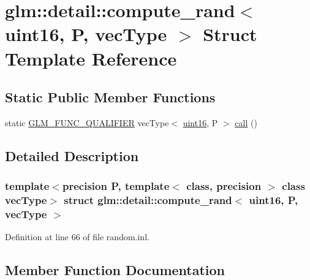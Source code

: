 \hypertarget{structglm_1_1detail_1_1compute__rand_3_01uint16_00_01_p_00_01vec_type_01_4}{}\section{glm\+::detail\+::compute\+\_\+rand$<$ uint16, P, vec\+Type $>$ Struct Template Reference}
\label{structglm_1_1detail_1_1compute__rand_3_01uint16_00_01_p_00_01vec_type_01_4}
\subsection*{Static Public Member Functions}
\begin{DoxyCompactItemize}
\item 
static \mbox{\hyperlink{setup_8hpp_a33fdea6f91c5f834105f7415e2a64407}{G\+L\+M\+\_\+\+F\+U\+N\+C\+\_\+\+Q\+U\+A\+L\+I\+F\+I\+ER}} vec\+Type$<$ \mbox{\hyperlink{namespaceglm_1_1detail_a47b2a7d006d187338e8031a352d1ce56}{uint16}}, P $>$ \mbox{\hyperlink{structglm_1_1detail_1_1compute__rand_3_01uint16_00_01_p_00_01vec_type_01_4_ae07d663b72169f25cbd1235917acbff8}{call}} ()
\end{DoxyCompactItemize}


\subsection{Detailed Description}
\subsubsection*{template$<$precision P, template$<$ class, precision $>$ class vec\+Type$>$\newline
struct glm\+::detail\+::compute\+\_\+rand$<$ uint16, P, vec\+Type $>$}



Definition at line 66 of file random.\+inl.



\subsection{Member Function Documentation}
\mbox{\label{structglm_1_1detail_1_1compute__rand_3_01uint16_00_01_p_00_01vec_type_01_4_ae07d663b72169f25cbd1235917acbff8}} 
